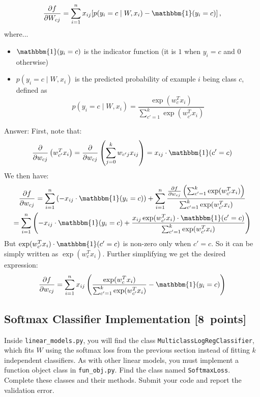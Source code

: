 \documentclass{article}
\newcommand{\blu}[1]{{\textcolor{blu}{#1}}}
\newenvironment{answer}{\par\begingroup\color{gre}Answer: }{\endgroup}
\let\ask\blu
\newcommand\pts[1]{\textcolor{pointscolour}{[#1~points]}}
\begin{document}
\[
\frac{\partial f}{\partial W_{cj}} = \sum_{i=1}^n x_{ij}[p(y_i=c \mid W,x_i) - \mathbbm{1}(y_i = c)] \, ,
\]
where...
\begin{itemize}
\item $\mathbbm{1}(y_i = c)$ is the indicator function (it is $1$ when $y_i=c$ and $0$ otherwise)
\item $p(y_i=c \mid W, x_i)$ is the predicted probability of example $i$ being class $c$, defined as
\[
p(y_i=c \mid W, x_i) = \frac{\exp(w_c^Tx_i)}{\sum_{c'=1}^k\exp(w_{c'}^Tx_i)}
\]
\end{itemize}
\begin{answer}
    First, note that:
    \[\frac{\partial}{\partial w_{cj}} \left( w_{c'}^T x_i \right) = \frac{\partial}{\partial w_{cj}} \left( \sum_{j=0}^k w_{c'j} x_{ij} \right) = x_{ij} \cdot \mathbbm{1}(c' = c)\]
    We then have:
    \begin{gather*}
        \frac{\partial f}{\partial w_{cj}} = \sum_{i=1}^n\left( -x_{ij} \cdot \mathbbm{1}(y_i = c) \right) + \sum_{i=1}^n \frac{\frac{\partial f}{\partial w_{cj}}\left(\sum_{c' = 1}^k \exp(w_{c'}^Tx_i)\right)}{\sum_{c' = 1}^k \exp(w_{c'}^Tx_i)}\\
        =\sum_{i=1}^n\left( -x_{ij} \cdot \mathbbm{1}(y_i = c) + \frac{x_{ij}\exp(w_{c'}^Tx_i) \cdot \mathbbm{1}(c' = c)}{\sum_{c' = 1}^k \exp(w_{c'}^Tx_i)}\right)\\
    \end{gather*}
    But $\exp(w_{c'}^Tx_i) \cdot \mathbbm{1}(c' = c)$ is non-zero only when $c'=c$. So it can be simply written as $\exp(w_{c}^Tx_i)$. Further simplifying we get the desired expression:
    \[\frac{\partial f}{\partial w_{cj}}=\sum_{i=1}^{n} x_{ij}\left(\frac{\exp(w_{c}^Tx_i)}{\sum_{c' = 1}^k \exp(w_{c'}^Tx_i)}-\mathbbm{1}(y_i = c)\right)\]
\end{answer}

\subsection{Softmax Classifier Implementation \pts{8}}

Inside \verb|linear_models.py|, you will find the class \verb|MulticlassLogRegClassifier|, which fits $W$ using the softmax loss from the previous section instead of fitting $k$ independent classifiers. As with other linear models, you must implement a function object class in \verb|fun_obj.py|. Find the class named \verb|SoftmaxLoss|. Complete these classes and their methods. \ask{Submit your code and report the validation error.}
\end{document}
